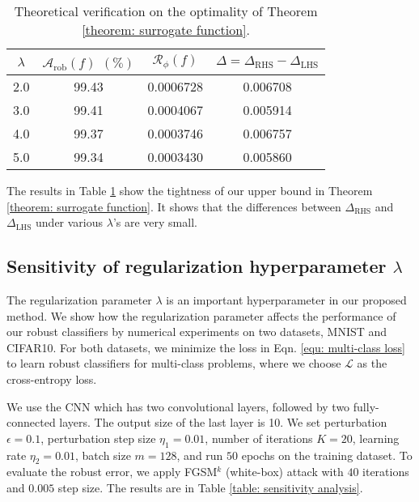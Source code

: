 \documentclass[11pt]{article}
\newcommand{\adv}{\mathrm{rob}}
\newcommand{\0}{\mathbf{0}}
\newcommand{\1}{\mathbf{1}}
\newcommand{\cA}{\mathcal{A}}
\newcommand{\cL}{\mathcal{L}}
\newcommand{\cR}{\mathcal{R}}
\begin{document}
\begin{table}
	\caption{Theoretical verification on the optimality of Theorem \ref{theorem: surrogate function}.}
	\label{table: theoretical upper bound tightness verification}
	\centering
\begin{tabular}{c|ccc}\hline
		$\lambda$ & $\cA_\adv(f)$  $(\%)$ & $\cR_\phi(f)$ & $\Delta = \Delta_{\text{RHS}} - \Delta_{\text{LHS}}$
		\\
		\hline
		2.0 & 99.43 & 0.0006728 & 0.006708\\
		3.0 & 99.41 & 0.0004067 & 0.005914\\
		4.0 & 99.37 & 0.0003746 & 0.006757\\
		5.0 & 99.34 & 0.0003430 & 0.005860\\
		\hline
	\end{tabular}
\end{table}
The results in Table \ref{table: theoretical upper bound tightness verification} show the tightness of our upper bound in Theorem \ref{theorem: surrogate function}. It shows that the differences between $\Delta_{\text{RHS}}$ and $\Delta_{\text{LHS}}$ under various $\lambda$'s are very small.

\vspace{-0.2cm}
\subsection{Sensitivity of regularization hyperparameter $\lambda$}
\vspace{-0.2cm}

The regularization parameter $\lambda$ is an important hyperparameter in our proposed method. We show how the regularization parameter affects the performance of our robust classifiers by numerical experiments on two datasets, MNIST and CIFAR10. For both datasets, we minimize the loss in Eqn. \eqref{equ: multi-class loss} to learn robust classifiers for multi-class problems, where we choose $\cL$ as the cross-entropy loss. 

\medskip
{} We use the CNN which has two convolutional layers, followed by two fully-connected layers. The output size of the last layer is 10. We set perturbation $\epsilon = 0.1$, perturbation step size $\eta_1 = 0.01$, number of iterations $K = 20$, learning rate $\eta_2 = 0.01$, batch size $m = 128$, and run $50$ epochs on the training dataset. To evaluate the robust error, we apply FGSM$^k$ (white-box) attack with $40$ iterations and $0.005$ step size. The results are in Table \ref{table: sensitivity analysis}.
\end{document}
